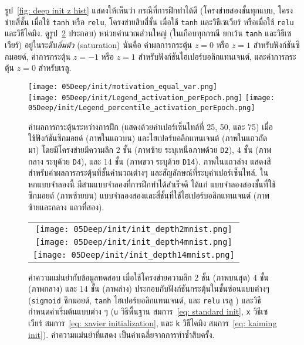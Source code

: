 \begin{Exercise}
รูป~\ref{fig: deep init z hist}
แสดงให้เห็นว่า
กรณีที่การฝึกทำได้ดี (โครงข่ายสองชั้นทุกแบบ,
โครงข่ายสี่ชั้น เมื่อใช้ \texttt{tanh} หรือ \texttt{relu},
โครงข่ายสิบสี่ชั้น เมื่อใช้ \texttt{tanh} และวิธีเซเวียร์
หรือเมื่อใช้ \texttt{relu} และวิธีไคมิง.
ดูรูป~\ref{fig: deep init test acc} ประกอบ)
หน่วยคำนวณส่วนใหญ่ (ในเกือบทุกกรณี ยกเว้น \texttt{tanh} และวิธีเซเวียร์)
อยู่ในระดับ\textit{อิ่มตัว} (saturation)
นั่นคือ 
ค่าผลการกระตุ้น $z = 0$ หรือ $z = 1$ สำหรับฟังก์ชันซิกมอยด์,
ค่าการกระตุ้น 
$z = -1$ หรือ $z = 1$ สำหรับฟังก์ชันไฮเปอร์บอลิกแทนเจนต์,
และค่าการกระตุ้น 
$z = 0$ สำหรับเรลู.

	
\end{Exercise}

\begin{figure}
	\begin{center}	
		\texttt{[image: 05Deep/init/motivation\_equal\_var.png]}
		\\
		\texttt{[image: 05Deep/init/Legend\_activation\_perEpoch.png]}
		\texttt{[image: 05Deep/init/Legend\_percentile\_activation\_perEpoch.png]}
	\end{center}	\caption[ผลการกระตุ้นระหว่างการฝึก]{ค่าผลการกระตุ้นระหว่างการฝึก (แสดงด้วยค่าเปอร์เซ็นไทล์ที่ 25, 50, และ 75) เมื่อใช้ฟังก์ชันซิกมอยด์ (ภาพในแถวบน) และไฮเปอร์บอลิกแทนเจนต์ (ภาพในแถวถัดมา) โดยมีโครงข่ายมีความลึก $2$ ชั้น (ภาพซ้าย ระบุเหนือภาพด้วย \texttt{D2}), $4$ ชั้น (ภาพกลาง ระบุด้วย \texttt{D4}), และ $14$ ชั้น (ภาพขวา ระบุด้วย \texttt{D14}).
		ภาพในแถวล่าง แสดงสี สำหรับค่าผลการกระตุ้นที่ชั้นคำนวณต่างๆ 
		และสัญลักษณ์ที่ระบุค่าเปอร์เซ็นไทล์.
		ในหกแบบจำลองนี้ 
		มีสามแบบจำลองที่การฝึกทำได้สำเร็จดี ได้แก่
		แบบจำลองสองชั้นที่ใช้ซิกมอยด์ (ภาพซ้ายบน)
		แบบจำลองสองและสี่ชั้นที่ใช้ไฮเปอร์บอลิกแทนเจนต์
		(ภาพซ้ายและกลาง แถวที่สอง).
	}			
	\label{fig: deep init motivation}
\end{figure}
%


\begin{figure}
	\begin{center}	
		\begin{tabular}{c}
			\texttt{[image: 05Deep/init/init\_depth2mnist.png]}
			\\
			\texttt{[image: 05Deep/init/init\_depth4mnist.png]}
			\\
			\texttt{[image: 05Deep/init/init\_depth14mnist.png]}
		\end{tabular}
	\end{center}		\caption[ผลเปรียบเทียบฟังก์ชันกระตุ้นและวิธีกำหนดค่าเริ่มต้น]{ค่าความแม่นยำกับข้อมูลทดสอบ เมื่อใช้โครงข่ายความลึก $2$ ชั้น (ภาพบนสุด) $4$ ชั้น (ภาพกลาง) และ $14$ ชั้น (ภาพล่าง) ประกอบกับฟังก์ชันกระตุ้นในชั้นซ่อนแบบต่างๆ (\texttt{sigmoid} ซิกมอยด์, 
		\texttt{tanh} ไฮเปอร์บอลิกแทนเจนต์,
		และ
		\texttt{relu} เรลู
		) และวิธีกำหนดค่าเริ่มต้นแบบต่าง ๆ (\texttt{u} วิธีพื้นฐาน สมการ~\ref{eq: standard init},
		\texttt{x} วิธีเซเวียร์ สมการ~\ref{eq: xavier initialization},
		และ
		\texttt{k} วิธีไคมิง สมการ~\ref{eq: kaiming init}).
		ค่าความแม่นยำที่แสดง
		เป็นค่าเฉลี่ยจากการทำซ้ำสิบครั้ง.}			
	\label{fig: deep init test acc}
\end{figure}
%

